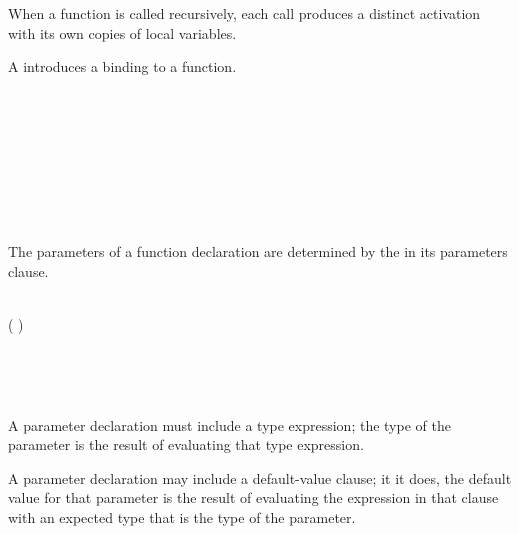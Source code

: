 \begin{Note}
When a function is called recursively, each call produces a distinct activation with its own copies of local variables.
\end{Note}


A  introduces a binding to a function.

\begin{Syntax}
     \\
          \\
            \SynOpt \\
             \\
            \SynOpt \\
            \SynOpt \\
             \\
\end{Syntax}


The parameters of a function declaration are determined by the  in its parameters clause.

\begin{Syntax}
     \\
        \code{(} ( \code{,}) \SynStar \code{)}

     \\
         \code{:} \SynOpt {} \SynOpt

     \\
        \code{=} 
\end{Syntax}

A parameter declaration must include a type expression; the type of the parameter is the result of evaluating that type expression.

A parameter declaration may include a default-value clause; it it does, the default value for that parameter is the result of evaluating the expression in that clause with an expected type that is the type of the parameter.


